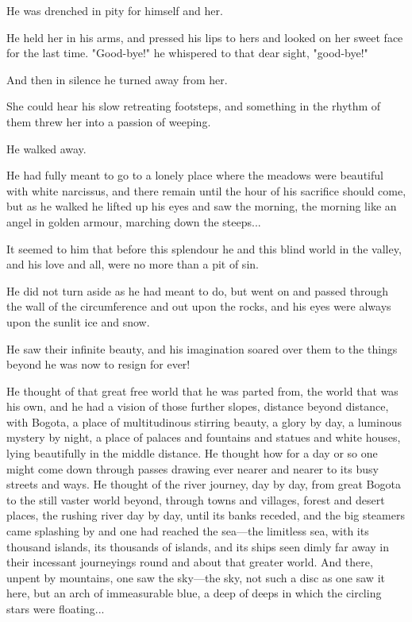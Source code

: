 \documentclass[courier]{sffms}
\begin{document}
He was drenched in pity for himself and her.

He held her in his arms, and pressed his lips to hers and looked on
her sweet face for the last time. "Good-bye!" he whispered to that
dear sight, "good-bye!"

And then in silence he turned away from her.

She could hear his slow retreating footsteps, and something in the
rhythm of them threw her into a passion of weeping.

He walked away.

He had fully meant to go to a lonely place where the meadows were
beautiful with white narcissus, and there remain until the hour of his
sacrifice should come, but as he walked he lifted up his eyes and saw
the morning, the morning like an angel in golden armour, marching down
the steeps...

It seemed to him that before this splendour he and this blind world in
the valley, and his love and all, were no more than a pit of sin.

He did not turn aside as he had meant to do, but went on and passed
through the wall of the circumference and out upon the rocks, and his
eyes were always upon the sunlit ice and snow.

He saw their infinite beauty, and his imagination soared over them to
the things beyond he was now to resign for ever!

He thought of that great free world that he was parted from, the world
that was his own, and he had a vision of those further slopes,
distance beyond distance, with Bogota, a place of multitudinous
stirring beauty, a glory by day, a luminous mystery by night, a place
of palaces and fountains and statues and white houses, lying
beautifully in the middle distance. He thought how for a day or so one
might come down through passes drawing ever nearer and nearer to its
busy streets and ways. He thought of the river journey, day by day,
from great Bogota to the still vaster world beyond, through towns and
villages, forest and desert places, the rushing river day by day,
until its banks receded, and the big steamers came splashing by and
one had reached the sea---the limitless sea, with its thousand islands,
its thousands of islands, and its ships seen dimly far away in their
incessant journeyings round and about that greater world. And there,
unpent by mountains, one saw the sky---the sky, not such a disc as one
saw it here, but an arch of immeasurable blue, a deep of deeps in
which the circling stars were floating...
\end{document}

